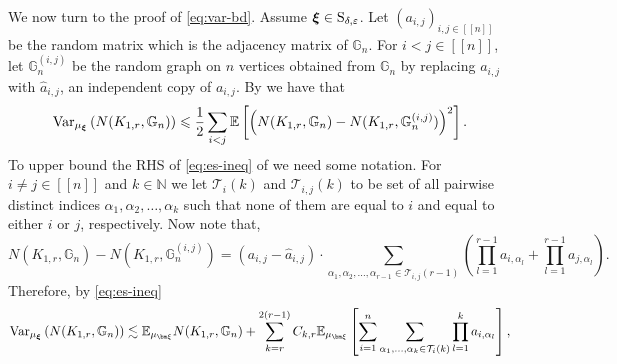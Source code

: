 \documentclass[a4paper,11pt,english,reqno]{amsart}
\numberwithin{equation}{section}
\renewcommand{\leq}{\leqslant}
\newcommand{\N}{\mathbb{N}}
\newcommand{\T}{\mathcal{T}}
\newcommand{\E}{\mathbb{E}}
\newcommand{\G}{\mathbb{G}}
\newcommand{\tu}[1]{\textup{#1}}
\newcommand{\set}[1]{[\![#1]\!]}
\begin{document}
	
	We now turn to the proof of \eqref{eq:var-bd}.  Assume $\boldsymbol{\xi}\in \tu{S}_{\delta, \varepsilon}$. Let $\left(a_{i,j}\right)_{i,j\in \set{n}}$ be the random matrix which is the adjacency matrix of $\G_{n}$. %
	For $i<j\in \set{n}$, let $\G_{n}^{(i,j)}$ be the random graph on $n$ vertices obtained from $\G_{n}$ by replacing $a_{i,j}$ with $\widehat{a}_{i,j}$, an independent copy of $a_{i,j}$. By \cite[Theorem~3.1]{concineq} we have that 
	\begin{equation}\label{eq:es-ineq}
		\tu{Var}_{\mu_{\boldsymbol{\xi}}}\left(N(K_{1,r}, \G_{n})\right)\leq \frac{1}{2}\sum_{i<j}\E\left[\left(N(K_{1,r}, \G_n)-N(K_{1,r}, \G_{n}^{(i,j)})\right)^{2}\right].
	\end{equation}
	To upper bound the RHS of \eqref{eq:es-ineq} of we need some notation. For $i \ne j \in \set{n}$ and $k \in \N$ we let  $\T_i(k)$ and $\T_{i,j}(k)$ to be set of all pairwise distinct indices $\alpha_1, \alpha_2, \ldots, \alpha_k$ such that none of them are equal to $i$ and equal to either $i$ or $j$, respectively. 
	Now note that,
	\begin{equation*}
		N(K_{1,r}, \G_n)-N(K_{1,r}, \G_{n}^{(i,j)}) = (a_{i,j}-\widehat{a}_{i,j})\cdot\sum_{\alpha_{1}, \alpha_2,\ldots, \alpha_{r-1}\in \T_{i,j}(r-1)}\left(\prod_{l=1}^{r-1}a_{i,\alpha_{l}}+\prod_{l=1}^{r-1}a_{j,\alpha_{l}}\right).
	\end{equation*}
	Therefore, by \eqref{eq:es-ineq} %
\begin{equation}
	\label{mf: split ineq}
	\tu{Var}_{\mu_{\boldsymbol{\xi}}}\left(N(K_{1,r}, \G_{n})\right)   \lesssim \E_{\mu_{{\bm \xi}}}  N(K_{1,r}, \G_{n})+\sum_{k=r}^{2(r-1)}C_{k,r} \E_{\mu_{{\bm \xi}}} \left[\sum_{i=1}^{n}\sum_{\alpha_1, \ldots, \alpha_{k}\in \T_{i}(k)}\prod_{l=1}^{k}a_{i, \alpha_l}\right],
\end{equation}
\end{document}
